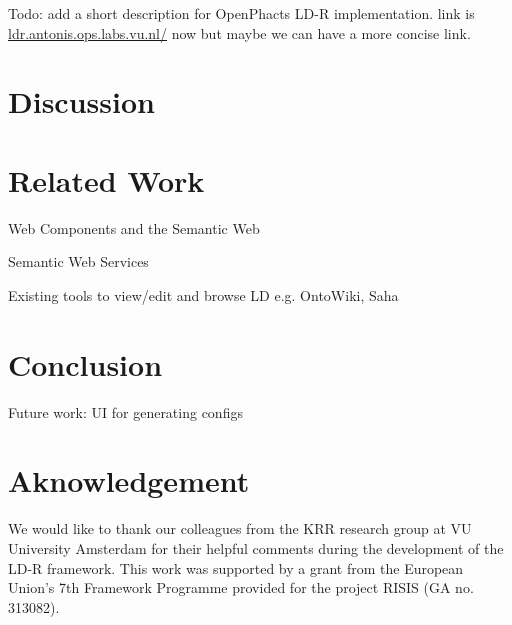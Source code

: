 \documentclass{acm_proc_article-sp}
\begin{document}
Todo: add a short description for OpenPhacts LD-R implementation.
link is \url{ldr.antonis.ops.labs.vu.nl/} now but maybe we can have a more concise link.

\section{Discussion}

\section{Related Work}

Web Components and the Semantic Web~\cite{pahl2011}

Semantic Web Services

Existing tools to view/edit and browse LD e.g. OntoWiki, Saha


\section{Conclusion}

Future work: UI for generating configs

\section{Aknowledgement}
We would like to thank our colleagues from the KRR research group at VU University Amsterdam for their helpful comments during the development of the LD-R framework. This work was supported by a grant from the European Union's 7th Framework Programme provided for the project RISIS (GA no. 313082).




\end{document}
